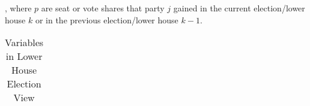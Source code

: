 , where $p$ are seat or vote shares that party $j$ gained in the current election/lower house $k$ or in the previous election/lower house $k-1$.


\begin{center}%
\begin{longtable}{l L{6cm} l}%
\caption{Variables in Lower House Election View\label{tab_view_lh_election}}


\end{longtable}
\end{center}%

